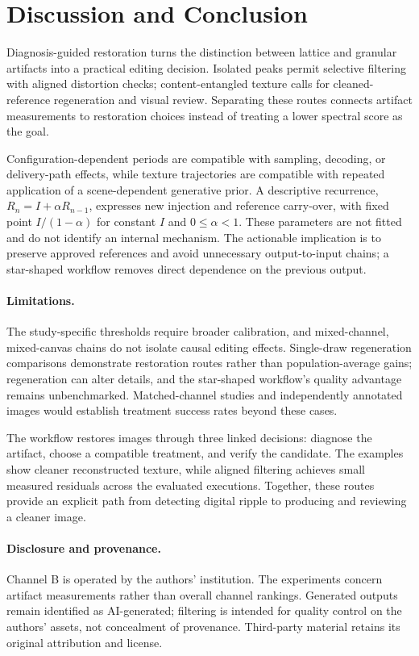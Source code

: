 \documentclass[sigplan,10pt,nonacm]{acmart}
\begin{document}
\section{Discussion and Conclusion}
Diagnosis-guided restoration turns the distinction between lattice and granular artifacts into a practical editing decision. Isolated peaks permit selective filtering with aligned distortion checks; content-entangled texture calls for cleaned-reference regeneration and visual review. Separating these routes connects artifact measurements to restoration choices instead of treating a lower spectral score as the goal.

Configuration-dependent periods are compatible with sampling, decoding, or delivery-path effects, while texture trajectories are compatible with repeated application of a scene-dependent generative prior. A descriptive recurrence, $R_n=I+\alpha R_{n-1}$, expresses new injection and reference carry-over, with fixed point $I/(1-\alpha)$ for constant $I$ and $0\leq\alpha<1$. These parameters are not fitted and do not identify an internal mechanism. The actionable implication is to preserve approved references and avoid unnecessary output-to-input chains; a star-shaped workflow removes direct dependence on the previous output.

\paragraph{Limitations.}
The study-specific thresholds require broader calibration, and mixed-channel, mixed-canvas chains do not isolate causal editing effects. Single-draw regeneration comparisons demonstrate restoration routes rather than population-average gains; regeneration can alter details, and the star-shaped workflow's quality advantage remains unbenchmarked. Matched-channel studies and independently annotated images would establish treatment success rates beyond these cases.

The workflow restores images through three linked decisions: diagnose the artifact, choose a compatible treatment, and verify the candidate. The examples show cleaner reconstructed texture, while aligned filtering achieves small measured residuals across the evaluated executions. Together, these routes provide an explicit path from detecting digital ripple to producing and reviewing a cleaner image.

\paragraph{Disclosure and provenance.}
Channel B is operated by the authors' institution. The experiments concern artifact measurements rather than overall channel rankings. Generated outputs remain identified as AI-generated; filtering is intended for quality control on the authors' assets, not concealment of provenance. Third-party material retains its original attribution and license.
\end{document}
